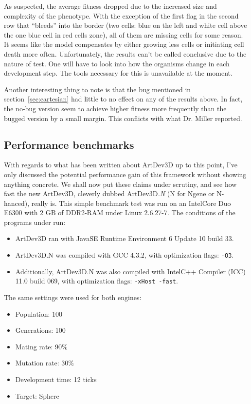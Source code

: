 As suspected, the average fitness dropped due to the increased size and complexity of the phenotype. With the exception of the first flag in the second row that ``bleeds'' into the border (two cells: blue on the left and white cell above the one blue cell in red cells zone), all of them are missing cells for some reason. It seems like the model compensates by either growing less cells or initiating cell death more often. Unfortunately, the results can't be called conclusive due to the nature of test. One will have to look into how the organisms change in each development step. The tools necessary for this is unavailable at the moment.

Another interesting thing to note is that the bug mentioned in section~\ref{sec:cartesian} had little to no effect on any of the results above. In fact, the no-bug version seem to achieve higher fitness more frequently than the bugged version by a small margin. This conflicts with what Dr. Miller reported.


\subsection{Performance benchmarks}
With regards to what has been written about ArtDev3D up to this point, I've only discussed the potential performance gain of this framework without showing anything concrete. We shall now put these claims under scrutiny, and see how fast the new ArtDev3D, cleverly dubbed ArtDev3D\emph{.N} (N for Ngene or N-hanced), really is. This simple benchmark test was run on an Intel\textregistered Core Duo E6300 with 2 GB of DDR2-RAM under Linux 2.6.27-7. The conditions of the programs under run:

\begin{itemize}
	\itemsep=0pt
	\item ArtDev3D ran with Java\texttrademark SE Runtime Environment 6 Update 10 build 33.
	\item ArtDev3D.N was compiled with GCC 4.3.2, with optimization flags: \texttt{-O3}.
	\item Additionally, ArtDev3D.N was also compiled with Intel\textregistered C++ Compiler (ICC) 11.0 build 069, with optimization flags: \texttt{-xHost -fast}.
\end{itemize}

The same settings were used for both engines:

\begin{itemize}
	\itemsep=-2pt
	\item Population: 100
	\item Generations: 100
	\item Mating rate: 90\%
	\item Mutation rate: 30\%
	\item Development time: 12 ticks
	\item Target: Sphere
\end{itemize}

